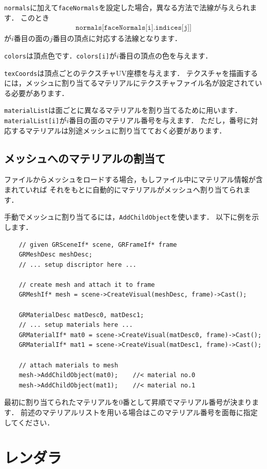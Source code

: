 \texttt{normals}に加えて\texttt{faceNormals}を設定した場合，異なる方法で法線が与えられます．
\KLUDGE このとき
\begin{align*}
\texttt{normals[faceNormals[i].indices[j]]}
\end{align*}
\KLUDGE が$i$番目の面の$j$番目の頂点に対応する法線となります．

\texttt{colors}は頂点色です．\texttt{colors[i]}が$i$番目の頂点の色を与えます．

\texttt{texCoords}は頂点ごとのテクスチャUV座標を与えます．
\KLUDGE テクスチャを描画するには，メッシュに割り当てるマテリアルにテクスチャファイル名が設定されている必要があります．

\texttt{materialList}は面ごとに異なるマテリアルを割り当てるために用います．
\texttt{materialList[i]}が$i$番目の面のマテリアル番号を与えます．
\KLUDGE ただし，番号に対応するマテリアルは別途メッシュに割り当てておく必要があります．

\subsection*{メッシュへのマテリアルの割当て}

\KLUDGE ファイルからメッシュをロードする場合，もしファイル中にマテリアル情報が含まれていれば
\KLUDGE それをもとに自動的にマテリアルがメッシュへ割り当てられます．

\KLUDGE 手動でメッシュに割り当てるには，\texttt{AddChildObject}を使います．
\KLUDGE 以下に例を示します．
\begin{verbatim}
    // given GRSceneIf* scene, GRFrameIf* frame
    GRMeshDesc meshDesc;
    // ... setup discriptor here ...

    // create mesh and attach it to frame
    GRMeshIf* mesh = scene->CreateVisual(meshDesc, frame)->Cast();

    GRMaterialDesc matDesc0, matDesc1;
    // ... setup materials here ...
    GRMaterialIf* mat0 = scene->CreateVisual(matDesc0, frame)->Cast();
    GRMaterialIf* mat1 = scene->CreateVisual(matDesc1, frame)->Cast();

    // attach materials to mesh
    mesh->AddChildObject(mat0);    //< material no.0
    mesh->AddChildObject(mat1);    //< material no.1
\end{verbatim}
\KLUDGE 最初に割り当てられたマテリアルを0番として昇順でマテリアル番号が決まります．
\KLUDGE 前述のマテリアルリストを用いる場合はこのマテリアル番号を面毎に指定してください．


\section{レンダラ}

